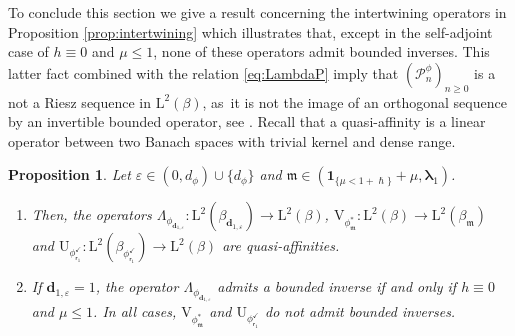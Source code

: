 \documentclass[JEP,XML,SOM,Unicode]{cedram}
\let\epsilon\varepsilon
\theoremstyle{plain}
\newtheorem{proposition}[theorem]{Proposition}
\theoremstyle{definition}
\renewcommand{\P}{\mathcal{P}}
\newcommand{\Leb}{\mathrm{L}}
\newcommand{\m}{\mathfrak{m}}
\newcommand{\dz}{{\bm{d}}_{1,\epsilon}}
\newcommand{\lam}{{\bm{\lambda}_1}}
\newcommand{\vat}{{\mathsf{r}_1}}
\newcommand{\phm}{{\phi_\m^*}}
\renewcommand{\varphi}{{\phi_{\vat}^{\checkmark}}}
\newcommand{\gab}[1][\lam,\mo]{{\beta_{#1}}}
\let\h\hslash
\let\mo\mu
\let\bpsi\beta
\begin{document}
To conclude this section we give a result concerning the intertwining operators in Proposition \ref{prop:intertwining} which illustrates that, except in the self-adjoint case of $h \equiv 0$ and $\mo \leq 1$, none of these operators admit bounded inverses. This latter fact combined with the relation \eqref{eq:LambdaP} imply that $(\P_n^\phi)_{n\geq0}$ is a not a Riesz sequence in $\Leb^2(\bpsi)$, as~it is not the image of an orthogonal sequence by an invertible bounded operator, see \cite{Christensen2003a}. Recall that a quasi-affinity is a linear operator between two Banach spaces with trivial kernel and dense range.

\begin{proposition}
\label{prop:quasi-similar}
Let $\epsilon \in (0,d_\phi) \cup \{d_\phi\}$ and $\m \in (\bm{1}_{\{\mo < 1+\h\}} + \mo ,\lam)$.
\begin{enumerate}
\item \label{item-1:prop:quasi-similar} Then, the operators $\Lambda_{\phi_{\dz}}:\Leb^2(\gab[\dz]) \to \Leb^2(\bpsi)$, $\mathrm{V}_{\phm}:\Leb^2(\bpsi)\to\Leb^2(\gab[\m])$ and $\mathrm{U}_\varphi:\Leb^2(\bpsi_\varphi) \to \Leb^2(\bpsi)$ are quasi-affinities.
\item \label{item-2:prop:quasi-similar}
If $\dz = 1$, the operator $\Lambda_{\phi_{\dz}}$ admits a bounded inverse if and only if $h \equiv 0$ and $\mo \leq 1$. In all cases, $\mathrm{V}_{\phm}$ and $\mathrm{U}_\varphi$ do not admit bounded inverses.
\end{enumerate}
\end{proposition}
\end{document}
